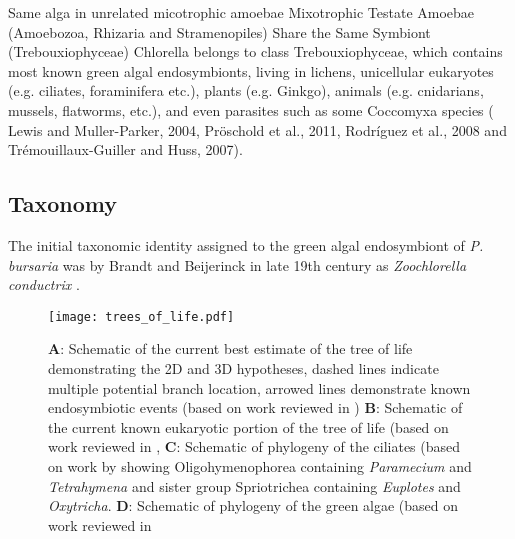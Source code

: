 Same alga in unrelated micotrophic amoebae \citep{Gomaa2014}
Mixotrophic Testate Amoebae
(Amoebozoa, Rhizaria and
Stramenopiles) Share the Same Symbiont
(Trebouxiophyceae)
Chlorella belongs to class Trebouxiophyceae, which contains most known green algal endosymbionts, living in lichens, unicellular eukaryotes (e.g. ciliates, foraminifera etc.), plants (e.g. Ginkgo), animals (e.g. cnidarians, mussels, flatworms, etc.), and even parasites such as some Coccomyxa species ( Lewis and Muller-Parker, 2004, Pröschold et al., 2011, Rodríguez et al., 2008 and Trémouillaux-Guiller and Huss, 2007).
\citep{Gomaa2014}


\subsection{Taxonomy}
The initial taxonomic identity assigned to the green algal endosymbiont of \textit{P. bursaria} was by Brandt and Beijerinck in 
late 19th century as \textit{Zoochlorella conductrix} \citep{Hoshina2010}.







 



\begin{figure}
    \texttt{[image: trees\_of\_life.pdf]}
    \caption{\textbf{A}: Schematic of the current best estimate of the tree of life demonstrating the 2D and 3D hypotheses,
dashed lines indicate multiple potential branch location, arrowed lines demonstrate known endosymbiotic events (based on work reviewed in \citep{Gribaldo2010})
\textbf{B}: Schematic of the current known eukaryotic portion of the tree of life (based on work reviewed in \citep{Burki2014,Adl2013},
\textbf{C}: Schematic of phylogeny of the ciliates (based on work by \citep{Bachvaroff2011} showing Oligohymenophorea containing \textit{Paramecium} and \textit{Tetrahymena} and sister group Spriotrichea containing \textit{Euplotes} and \textit{Oxytricha}.
\textbf{D}: Schematic of phylogeny of the green algae (based on work reviewed in \citep{Leliaert2012}}
    \label{fig:tol}
\end{figure}


